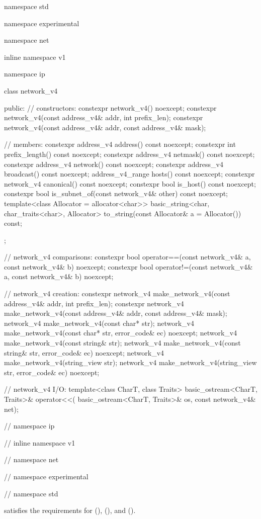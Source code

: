 \begin{codeblock}
namespace std {
namespace experimental {
namespace net {
inline namespace v1 {
namespace ip {

  class network_v4
  {
  public:
    // constructors:
    constexpr network_v4() noexcept;
    constexpr network_v4(const address_v4& addr, int prefix_len);
    constexpr network_v4(const address_v4& addr, const address_v4& mask);

    // members:
    constexpr address_v4 address() const noexcept;
    constexpr int prefix_length() const noexcept;
    constexpr address_v4 netmask() const noexcept;
    constexpr address_v4 network() const noexcept;
    constexpr address_v4 broadcast() const noexcept;
    address_v4_range hosts() const noexcept;
    constexpr network_v4 canonical() const noexcept;
    constexpr bool is_host() const noexcept;
    constexpr bool is_subnet_of(const network_v4& other) const noexcept;
    template<class Allocator = allocator<char>>
      basic_string<char, char_traits<char>, Allocator>
        to_string(const Allocator& a = Allocator()) const;
  };

  // network_v4 comparisons:
  constexpr bool operator==(const network_v4& a, const network_v4& b) noexcept;
  constexpr bool operator!=(const network_v4& a, const network_v4& b) noexcept;

  // network_v4 creation:
  constexpr network_v4 make_network_v4(const address_v4& addr, int prefix_len);
  constexpr network_v4 make_network_v4(const address_v4& addr, const address_v4& mask);
  network_v4 make_network_v4(const char* str);
  network_v4 make_network_v4(const char* str, error_code& ec) noexcept;
  network_v4 make_network_v4(const string& str);
  network_v4 make_network_v4(const string& str, error_code& ec) noexcept;
  network_v4 make_network_v4(string_view str);
  network_v4 make_network_v4(string_view str, error_code& ec) noexcept;

  // network_v4 I/O:
  template<class CharT, class Traits>
    basic_ostream<CharT, Traits>& operator<<(
      basic_ostream<CharT, Traits>& os, const network_v4& net);

} // namespace ip
} // inline namespace v1
} // namespace net
} // namespace experimental
} // namespace std
\end{codeblock}

\pnum
{} satisfies the requirements for  (),  (), and  ().


